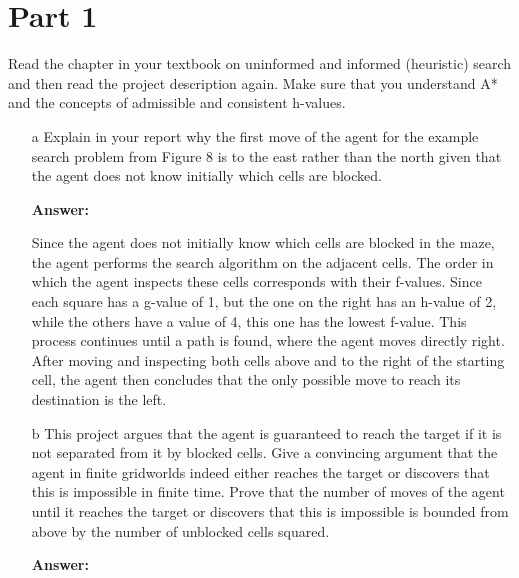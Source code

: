 \documentclass{article}
\begin{document}
\section*{Part 1}
Read the chapter in your textbook on uninformed and informed (heuristic) search and then read the project description again. Make sure that you understand A* and the concepts of admissible and consistent h-values.
\begin{enumerate}
    \item[a] Explain in your report why the first move of the agent for the example search problem from Figure 8 is to the east rather than the north given that the agent does not know initially which cells are blocked.

    {\color{blue} \textbf{Answer:}
    
    Since the agent does not initially know which cells are blocked in the maze, the agent performs the search algorithm on the adjacent cells. The order in which the agent inspects these cells corresponds with their f-values. Since each square has a g-value of 1, but the one on the right has an h-value of 2, while the others have a value of 4, this one has the lowest f-value. This process continues until a path is found, where the agent moves directly right. After moving and inspecting both cells above and to the right of the starting cell, the agent then concludes that the only possible move to reach its destination is the left.}
    
    
    \item[b] This project argues that the agent is guaranteed to reach the target if it is not separated from it by blocked cells. Give a convincing argument that the agent in finite gridworlds indeed either reaches the target or discovers that this is impossible in finite time. Prove that the number of moves of the agent until it reaches the target or discovers that this is impossible is bounded from above by the number of unblocked cells squared.

    {\color{blue} \textbf{Answer:}

}
\end{enumerate}
\end{document}
